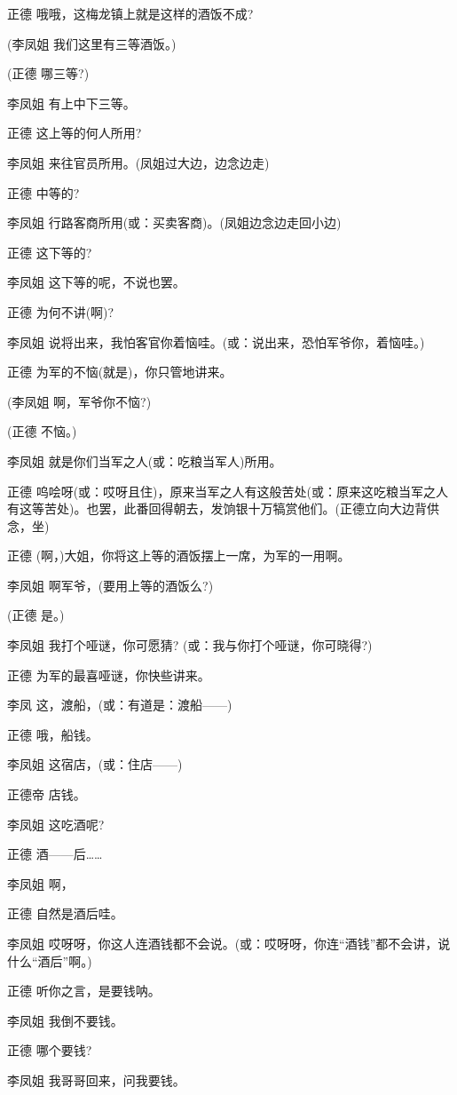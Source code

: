 正德 哦哦，这梅龙镇上就是这样的酒饭不成?

(李凤姐 我们这里有三等酒饭。)

(正德 哪三等?)

李凤姐 有上中下三等。

正德 这上等的何人所用?

李凤姐 来往官员所用。(凤姐过大边，边念边走)

正德 中等的?

李凤姐 行路客商所用(或：买卖客商)。(凤姐边念边走回小边)

正德 这下等的?

李凤姐 这下等的呢，不说也罢。

正德 为何不讲(啊)?

李凤姐 说将出来，我怕客官你着恼哇。(或：说出来，恐怕军爷你，着恼哇。)

正德 为军的不恼(就是)，你只管地讲来。

(李凤姐 啊，军爷你不恼?)

(正德 不恼。)

李凤姐 就是你们当军之人(或：吃粮当军人)所用。

正德
呜哙呀(或：哎呀且住)，原来当军之人有这般苦处(或：原来这吃粮当军之人有这等苦处)。也罢，此番回得朝去，发饷银十万犒赏他们。(正德立向大边背供念，坐)

正德 (啊，)大姐，你将这上等的酒饭摆上一席，为军的一用啊。

李凤姐 啊军爷，(要用上等的酒饭么?)

(正德 是。)

李凤姐 我打个哑谜，你可愿猜? (或：我与你打个哑谜，你可晓得?)

正德 为军的最喜哑谜，你快些讲来。

李凤 这，渡船，(或：有道是：渡船------)

正德 哦，船钱。

李凤姐 这宿店，(或：住店------)

正德帝 店钱。

李凤姐 这吃酒呢?

正德 酒------后\ldots{}\ldots{}

李凤姐 啊，

正德 自然是酒后哇。

李凤姐
哎呀呀，你这人连酒钱都不会说。(或：哎呀呀，你连``酒钱''都不会讲，说什么``酒后''啊。)

正德 听你之言，是要钱呐。

李凤姐 我倒不要钱。

正德 哪个要钱?

李凤姐 我哥哥回来，问我要钱。

